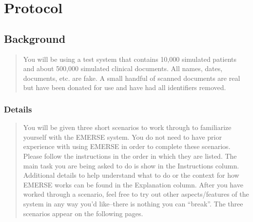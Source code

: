 \section{Protocol}
\subsection{Background}
\begin{quote}
    You will be using a test system that contains 10,000 simulated patients and about 500,000 simulated clinical documents. All names, dates, documents, etc. are fake. A small handful of scanned documents are real but have been donated for use and have had all identifiers removed. 
\end{quote}
\subsubsection{Details}
\begin{quote}
    You will be given three short scenarios to work through to familiarize yourself with the EMERSE system. You do not need to have prior experience with using EMERSE in order to complete these scenarios. Please follow the instructions in the order in which they are listed. The main task you are being asked to do is show in the Instructions column. Additional details to help understand what to do or the context for how EMERSE works can be found in the Explanation column. After you have worked through a scenario, feel free to try out other aspects/features of the system in any way you’d like--there is nothing you can “break”. The three scenarios appear on the following pages.
\end{quote}

